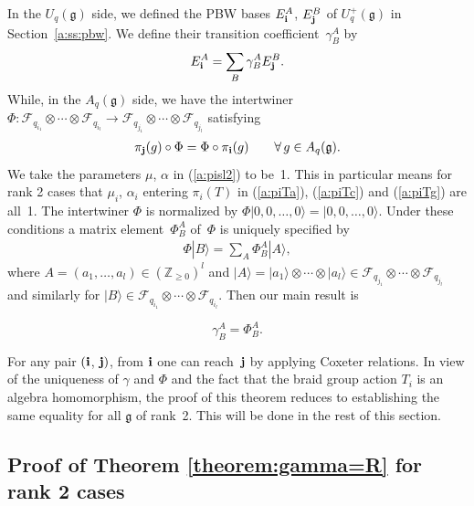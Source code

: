\documentclass[pdftex]{sigma}
\newcommand{\geh}{\mathfrak{g}}
\newcommand{\Z}{{\mathbb Z}}
\begin{document}
In the $U_q(\geh)$ side, we def\/ined
the PBW bases
$E_{\bf i}^A$, $E_{\bf j}^B$ of $U_q^+(\geh)$ in Section~\ref{a:ss:pbw}.
We def\/ine their transition coef\/f\/icient~$\gamma^A_B$ by
\begin{gather*}
E_{\bf i}^A=\sum_B \gamma^A_B E_{\bf j}^B.
\end{gather*}
While, in the $A_q(\geh)$ side, we have the intertwiner
$\Phi:
\mathcal{F}_{q_{i_1}}\otimes \cdots \otimes \mathcal{F}_{q_{i_l}}
\rightarrow
\mathcal{F}_{q_{j_1}}\otimes \cdots \otimes \mathcal{F}_{q_{j_l}}$
satisfying
\begin{gather}\label{a:piphi}
\pi_{\bf j}(g)\circ \Phi = \Phi \circ \pi_{\bf i}(g)\qquad
\forall\, g \in A_q(\mathfrak{g}).
\end{gather}
We take the parameters
$\mu$, $\alpha$ in (\ref{a:pisl2}) to be~1.
This in particular means for rank 2 cases that $\mu_i$, $\alpha_i$
entering $\pi_i(T)$ in (\ref{a:piTa}), (\ref{a:piTc}) and
(\ref{a:piTg}) are all~1.
The intertwiner $\Phi$ is normalized
by $\Phi |0,0,\ldots, 0\rangle =  |0,0,\ldots, 0\rangle$.
Under these conditions a matrix element~$\Phi^A_B$ of~$\Phi$
is uniquely specif\/ied by
\begin{gather*}
\Phi |B\rangle=\sum_A \Phi^A_B |A\rangle,
\end{gather*}
where $A=(a_1, \ldots, a_l) \in (\Z_{\ge 0})^l$ and
$|A\rangle = |a_1\rangle \otimes \cdots \otimes |a_l\rangle
\in \mathcal{F}_{q_{j_1}}\otimes \cdots \otimes \mathcal{F}_{q_{j_l}}$
and similarly for $|B\rangle
\in \mathcal{F}_{q_{i_1}}\otimes \cdots \otimes \mathcal{F}_{q_{i_l}}$.
Then our main result is
\begin{theorem}\label{theorem:gamma=R}
\[
\gamma^A_B=\Phi^A_B.
\]
\end{theorem}

For any pair $({\bf i}$, ${\bf j})$, from ${\bf i}$ one can reach~${\bf j}$ by applying Coxeter relations.
In view of the uniqueness of $\gamma$ and $\Phi$
and the fact that
the braid group action $T_i$ is an algebra homomorphism,
the proof of this theorem reduces to
establishing the same equality for all $\geh$ of rank~2.
This will  be done in the rest of this section.

\subsection{Proof of Theorem \ref{theorem:gamma=R} for rank 2 cases}
\end{document}
